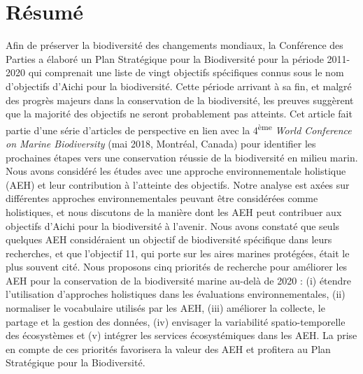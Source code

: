 \label{ann1}
\addtocounter{chapter}{1}

\section{Résumé}
Afin de préserver la biodiversité des changements mondiaux, la Conférence des Parties a élaboré un Plan Stratégique pour la Biodiversité pour la période 2011-2020 qui comprenait une liste de vingt objectifs spécifiques connus sous le nom d'objectifs d'Aichi pour la biodiversité. Cette période arrivant à sa fin, et malgré des progrès majeurs dans la conservation de la biodiversité, les preuves suggèrent que la majorité des objectifs ne seront probablement pas atteints. Cet article fait partie d'une série d'articles de perspective en lien avec la 4\textsuperscript{ème} \textit{World Conference on Marine Biodiversity} (mai 2018, Montréal, Canada) pour identifier les prochaines étapes vers une conservation réussie de la biodiversité en milieu marin. Nous avons considéré les études avec une approche environnementale holistique (AEH) et leur contribution à l'atteinte des objectifs. Notre analyse est axées sur différentes approches environnementales peuvant être considérées comme holistiques, et nous discutons de la manière dont les AEH peut contribuer aux objectifs d'Aichi pour la biodiversité à l'avenir. Nous avons constaté que seuls quelques AEH considéraient un objectif de biodiversité spécifique dans leurs recherches, et que l'objectif 11, qui porte sur les aires marines protégées, était le plus souvent cité. Nous proposons cinq priorités de recherche pour améliorer les AEH pour la conservation de la biodiversité marine au-delà de 2020 : (i) étendre l'utilisation d'approches holistiques dans les évaluations environnementales, (ii) normaliser le vocabulaire utilisés par les AEH, (iii) améliorer la collecte, le partage et la gestion des données, (iv) envisager la variabilité spatio-temporelle des écosystèmes et (v) intégrer les services écosystémiques dans les AEH. La prise en compte de ces priorités favorisera la valeur des AEH et profitera au Plan Stratégique pour la Biodiversité.

